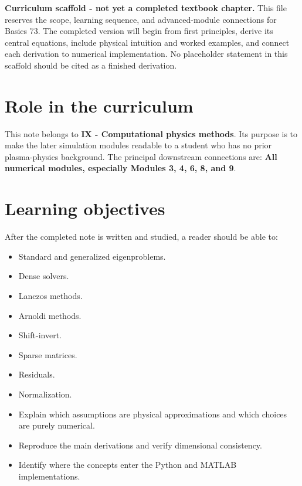 \documentclass[11pt]{article}
\begin{document}

\begin{overviewbox}
\textbf{Curriculum scaffold - not yet a completed textbook chapter.} This file reserves the scope, learning sequence, and advanced-module connections for Basics 73. The completed version will begin from first principles, derive its central equations, include physical intuition and worked examples, and connect each derivation to numerical implementation. No placeholder statement in this scaffold should be cited as a finished derivation.
\end{overviewbox}

\ProjectTOC

\section{Role in the curriculum}
This note belongs to \textbf{IX - Computational physics methods}. Its purpose is to make the later simulation modules readable to a student who has no prior plasma-physics background. The principal downstream connections are: \textbf{All numerical modules, especially Modules 3, 4, 6, 8, and 9}.

\section{Learning objectives}
After the completed note is written and studied, a reader should be able to:
\begin{itemize}[leftmargin=1.6em]
\item Standard and generalized eigenproblems.
\item Dense solvers.
\item Lanczos methods.
\item Arnoldi methods.
\item Shift-invert.
\item Sparse matrices.
\item Residuals.
\item Normalization.
\item Explain which assumptions are physical approximations and which choices are purely numerical.
\item Reproduce the main derivations and verify dimensional consistency.
\item Identify where the concepts enter the Python and MATLAB implementations.
\end{itemize}
\end{document}
